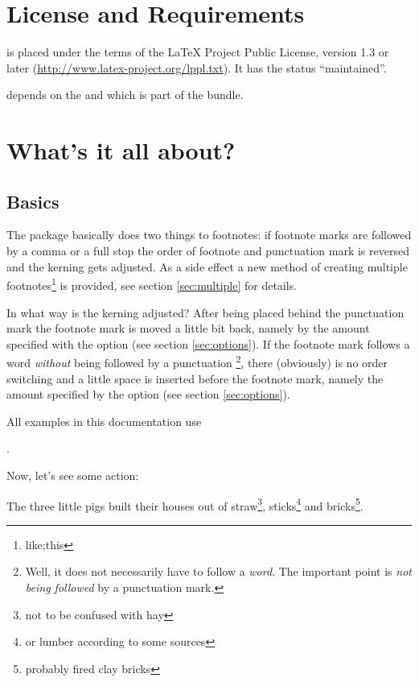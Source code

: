 \documentclass[toc=index,toc=bib]{cnpkgdoc}
\newcommand\setapart[1]{\medskip\hspace{1em}#1\medskip}
\begin{document}
\section{License and Requirements}
\fnpct is placed under the terms of the LaTeX Project Public License,
version 1.3 or later (\url{http://www.latex-project.org/lppl.txt}).
It has the status \enquote{maintained}.

\fnpct depends on the  and  which is part of the
 bundle.

\section{What's it all about?}
\subsection{Basics}
The \fnpct package basically does two things to footnotes: if footnote marks are
followed by a comma or a full stop the order of footnote and punctuation mark is
reversed and the kerning gets adjusted. As a side effect a new method of creating
multiple footnotes\footnote{like;this} is provided, see section \ref{sec:multiple}
for details.

In what way is the kerning adjusted? After being placed behind the punctuation
mark the footnote mark is moved a little bit back, namely by the amount specified
with the option  (see section \ref{sec:options}). If the
footnote mark follows a word \emph{without} being followed by a punctuation%
\footnote{Well, it does not necessarily have to follow a \emph{word}. The important
point is \emph{not being followed} by a punctuation mark.}, there (obviously) is
no order switching and a little space is inserted before the footnote mark, namely
the amount specified by the option  (see section
\ref{sec:options}).

All examples in this documentation use

\setapart{\cmd{thempfootnote}{\cmd{arabic}{mpfootnote}}}.

Now, let's see some action:
\begin{beispiel}
 \begin{minipage}{.4\linewidth}
  \noindent The three little pigs built their houses
  out of straw\footnote{not to be confused with hay},
  sticks\footnote{or lumber according to some sources}
  and bricks\footnote{probably fired clay bricks}.
 \end{minipage}
\end{beispiel}
\end{document}

